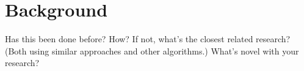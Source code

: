 \section{Background}
\label{02}

Has this been done before? How? If not, what’s the closest related research? (Both using similar approaches and other algorithms.) What’s novel with your research?